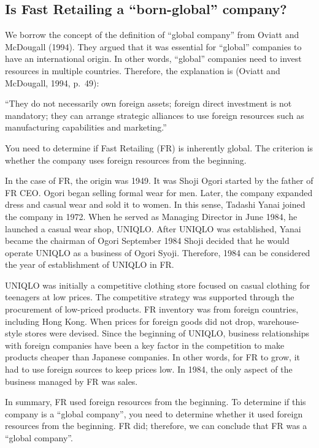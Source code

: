 \documentclass[12pt,a4paper]{article}
\begin{document}
\hypertarget{is-fast-retailing-a-born-global-company}{%
\subsection{Is Fast Retailing a ``born-global''
company?}\label{is-fast-retailing-a-born-global-company}}

We borrow the concept of the definition of ``global company'' from
Oviatt and McDougall (1994). They argued that it was essential for
``global'' companies to have an international origin. In other words,
``global'' companies need to invest resources in multiple countries.
Therefore, the explanation is (Oviatt and McDougall, 1994, p.~49):

``They do not necessarily own foreign assets; foreign direct investment
is not mandatory; they can arrange strategic alliances to use foreign
resources such as manufacturing capabilities and marketing.''

You need to determine if Fast Retailing (FR) is inherently global. The
criterion is whether the company uses foreign resources from the
beginning.

In the case of FR, the origin was 1949. It was Shoji Ogori started by
the father of FR CEO. Ogori began selling formal wear for men. Later,
the company expanded dress and casual wear and sold it to women. In this
sense, Tadashi Yanai joined the company in 1972. When he served as
Managing Director in June 1984, he launched a casual wear shop, UNIQLO.
After UNIQLO was established, Yanai became the chairman of Ogori
September 1984 Shoji decided that he would operate UNIQLO as a business
of Ogori Syoji. Therefore, 1984 can be considered the year of
establishment of UNIQLO in FR.

UNIQLO was initially a competitive clothing store focused on casual
clothing for teenagers at low prices. The competitive strategy was
supported through the procurement of low-priced products. FR inventory
was from foreign countries, including Hong Kong. When prices for foreign
goods did not drop, warehouse-style stores were devised. Since the
beginning of UNIQLO, business relationships with foreign companies have
been a key factor in the competition to make products cheaper than
Japanese companies. In other words, for FR to grow, it had to use
foreign sources to keep prices low. In 1984, the only aspect of the
business managed by FR was sales.

In summary, FR used foreign resources from the beginning. To determine
if this company is a ``global company'', you need to determine whether
it used foreign resources from the beginning. FR did; therefore, we can
conclude that FR was a ``global company''.
\end{document}
